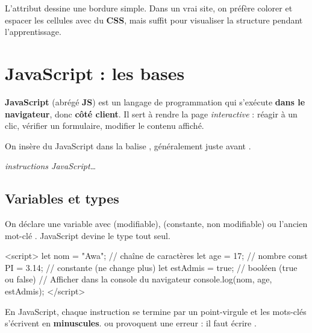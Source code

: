 
\begin{remarque}
L'attribut  dessine une bordure simple. Dans un vrai site, on
préfère colorer et espacer les cellules avec du \textbf{CSS}, mais 
suffit pour visualiser la structure pendant l'apprentissage.
\end{remarque}

\section{JavaScript : les bases}

\begin{definition}
\textbf{JavaScript} (abrégé \textbf{JS}) est un langage de programmation qui
s'exécute \textbf{dans le navigateur}, donc \textbf{côté client}. Il sert à rendre
la page \emph{interactive} : réagir à un clic, vérifier un formulaire, modifier le
contenu affiché.
\end{definition}

On insère du JavaScript dans la balise , généralement juste avant
.

\begin{syntaxe}
\quad \textit{instructions JavaScript\dots}\quad {}
\end{syntaxe}

\subsection{Variables et types}

On déclare une variable avec  (modifiable),  (constante,
non modifiable) ou l'ancien mot-clé . JavaScript devine le type tout seul.

\begin{codejs}
<script>
  let nom = "Awa";         // chaîne de caractères
  let age = 17;            // nombre
  const PI = 3.14;         // constante (ne change plus)
  let estAdmis = true;     // booléen (true ou false)
  // Afficher dans la console du navigateur
  console.log(nom, age, estAdmis);
</script>
\end{codejs}

\begin{attention}
En JavaScript, chaque instruction se termine par un point-virgule \code{;} et les
mots-clés s'écrivent en \textbf{minuscules}.  ou  provoquent
une erreur : il faut écrire .
\end{attention}

